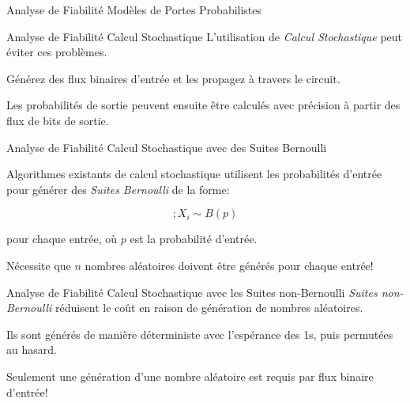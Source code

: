 \documentclass [12pt]{beamer}
\begin{document}
\begin{frame}{Analyse de Fiabilité \small Modèles de Portes Probabilistes}
\end{frame}

\begin{frame}{Analyse de Fiabilité \small Calcul Stochastique}
L'utilisation de \emph{Calcul Stochastique} peut éviter ces problèmes.
\vspace{0.25 cm}

Générez des flux binaires d'entrée et les propagez à travers le circuit.
\vspace{0.25 cm}

Les probabilités de sortie peuvent ensuite être calculés avec précision à partir des flux de bits de sortie.
\end{frame}

\begin{frame}{Analyse de Fiabilité \small Calcul Stochastique avec des Suites Bernoulli}

Algorithmes existants de calcul stochastique utilisent les probabilités d'entrée pour générer des \emph{Suites Bernoulli} de la forme:

\begin{equation*}
[X_0, X_1 \dots X_{n-1}]; X_i \sim B (p)
\end{equation*}

pour chaque entrée, où $p$ est la probabilité d'entrée.
\vspace{0.25 cm}

Nécessite que $n$ nombres aléatoires doivent être générés pour chaque entrée!
\end{frame}

\begin{frame}{Analyse de Fiabilité \small Calcul Stochastique avec les Suites non-Bernoulli}
\emph{Suites non-Bernoulli} réduisent le coût en raison de génération de nombres aléatoires.
\vspace{0.25 cm}

Ils sont générés de manière déterministe avec l'espérance des 1s, puis permutées au hasard.
\vspace{0.25 cm}

Seulement une génération d'une nombre aléatoire est requis par flux binaire d'entrée!
\end{frame}
\end{document}
